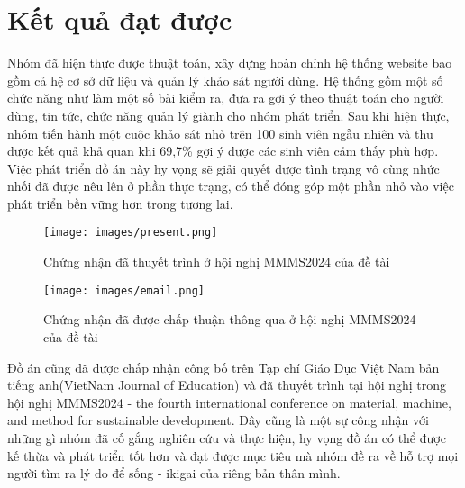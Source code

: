 \section{Kết quả đạt được}
    Nhóm đã hiện thực được thuật toán, xây dựng hoàn chỉnh hệ thống website bao gồm cả hệ cơ sở dữ liệu và quản lý khảo sát người dùng. Hệ thống gồm một số chức năng như làm một số bài kiểm ra, đưa ra gợi ý theo thuật toán cho người dùng, tin tức, chức năng quản lý giành cho nhóm phát triển. Sau khi hiện thực, nhóm tiến hành một cuộc khảo sát nhỏ trên 100 sinh viên ngẫu nhiên và thu được kết quả khả quan khi 69,7\% gợi ý được các sinh viên cảm thấy phù hợp. Việc phát triển đồ án này hy vọng sẽ giải quyết được tình trạng vô cùng nhức nhối đã được nêu lên ở phần thực trạng, có thể đóng góp một phần nhỏ vào việc phát triển bền vững hơn trong tương lai.
    
    \begin{figure}[H]
        \centering
        \texttt{[image: images/present.png]}
        \vspace{0.6cm}
        \caption{Chứng nhận đã thuyết trình ở hội nghị MMMS2024 của đề tài}
    \end{figure}

    \begin{figure}[H]
        \centering
        \texttt{[image: images/email.png]}
        \vspace{0.6cm}
        \caption{Chứng nhận đã được chấp thuận thông qua ở hội nghị MMMS2024 của đề tài}
    \end{figure}
    

    Đồ án cũng đã được chấp nhận công bố trên Tạp chí Giáo Dục Việt Nam bản tiếng anh(VietNam Journal of Education) và đã thuyết trình tại hội nghị trong hội nghị MMMS2024 - the fourth international conference on material, machine, and method for sustainable development. Đây cũng là một sự công nhận với những gì nhóm đã cố gắng nghiên cứu và thực hiện, hy vọng đồ án có thể được kế thừa và phát triển tốt hơn và đạt được mục tiêu mà nhóm đề ra về hỗ trợ mọi người tìm ra lý do để sống - ikigai của riêng bản thân mình.
